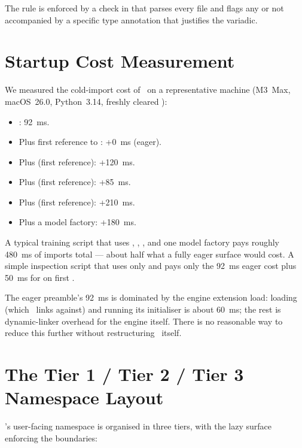 The rule is enforced by a check in
 that parses every  file
and flags any  or  not accompanied by a
specific type annotation that justifies the variadic.

\section{Startup Cost Measurement}
\label{sec:lazy_imports:startup}

We measured the cold-import cost of \Lucid\ on a representative
machine (M3~Max, macOS~26.0, Python~3.14, freshly cleared
):

\begin{itemize}
  \item {}: 92~ms.
  \item Plus first reference to : +0~ms (eager).
  \item Plus  (first reference): +120~ms.
  \item Plus  (first reference): +85~ms.
  \item Plus  (first reference): +210~ms.
  \item Plus a  model factory: +180~ms.
\end{itemize}

A typical training script that uses , ,
, and one model factory pays roughly 480~ms of
imports total --- about half what a fully eager surface would
cost. A simple inspection script that uses only 
and  pays only the 92~ms eager cost plus
50~ms for  on first .

The eager preamble's 92~ms is dominated by the engine extension
load: loading  (which \Lucid\ links against) and
running its initialiser is about 60~ms; the rest is dynamic-linker
overhead for the engine  itself. There is no reasonable
way to reduce this further without restructuring \MLX\ itself.

\section{The Tier 1 / Tier 2 / Tier 3 Namespace Layout}
\label{sec:lazy_imports:tiers}

\Lucid's user-facing namespace is organised in three tiers, with
the lazy surface enforcing the boundaries:

